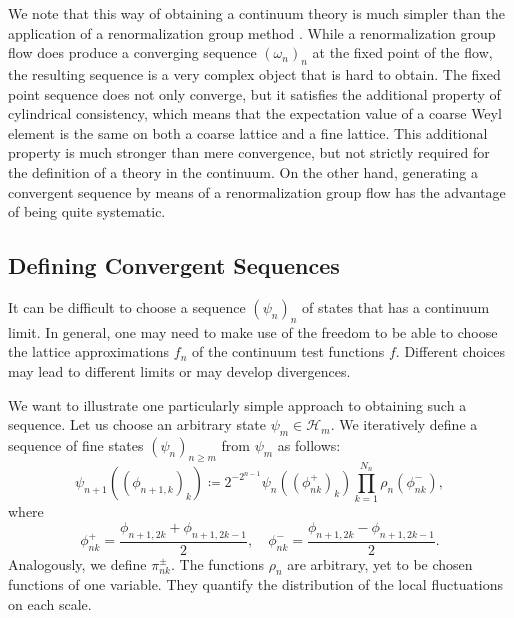 We note that this way of obtaining a continuum theory is much simpler than the application of a renormalization group method \parencite[e.g.][]{Lang:2017beo}.
While a renormalization group flow does produce a converging sequence $(\omega_n)_n$ at the fixed point of the flow, the resulting sequence is a very complex object that is hard to obtain.
The fixed point sequence does not only converge, but it satisfies the additional property of cylindrical consistency, which means that the expectation value of a coarse Weyl element is the same on both a coarse lattice and a fine lattice.
This additional property is much stronger than mere convergence, but not strictly required for the definition of a theory in the continuum.
On the other hand, generating a convergent sequence by means of a renormalization group flow has the advantage of being quite systematic.

\subsection{Defining Convergent Sequences}
It can be difficult to choose a sequence $(\psi_n)_n$ of states that has a continuum limit.
In general, one may need to make use of the freedom to be able to choose the lattice approximations $f_n$ of the continuum test functions $f$.
Different choices may lead to different limits or may develop divergences.

We want to illustrate one particularly simple approach to obtaining such a sequence.
Let us choose an arbitrary state $\psi_{m} \in \mathcal H_{m}$.
We iteratively define a sequence of fine states $(\psi_n)_{n\geq m}$ from $\psi_{m}$ as follows:
\begin{equation}
    \psi_{n+1}((\phi_{n+1,k})_k) \coloneq 2^{-2^{n-1}} \psi_n((\phi_{nk}^+)_k) \prod_{k=1}^{N_n} \rho_{n}(\phi_{nk}^-),
\end{equation}
where
\begin{equation}
    \phi_{nk}^+ = \frac{\phi_{n+1,2k} + \phi_{n+1,2k-1}}{2}, \quad \phi_{nk}^- = \frac{\phi_{n+1,2k} - \phi_{n+1,2k-1}}{2}. \label{eq:change-of-variables}
\end{equation}
Analogously, we define $\pi_{nk}^\pm$.
The functions $\rho_n$ are arbitrary, yet to be chosen functions of one variable.
They quantify the distribution of the local fluctuations on each scale.

